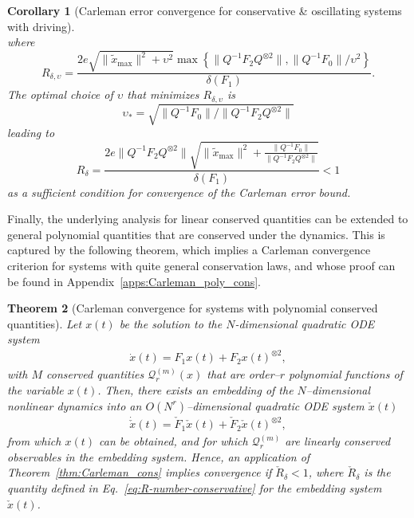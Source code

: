 \documentclass[superscriptaddress,onecolumn,nofootinbib,longbibliography,a4paper,accepted=2026-09-29]{quantumarticle}
\theoremstyle{plain}
\newtheorem{thm}{Theorem}
\newtheorem{cor}[thm]{Corollary}
\theoremstyle{definition}
\numberwithin{thm}{section}
\numberwithin{assumption}{section}
\numberwithin{lemma}{section}
\numberwithin{prop}{section}
\numberwithin{cor}{section}
\numberwithin{definition}{section}
\numberwithin{rmk}{section}
\numberwithin{equation}{section}
\newcommand{\ot}{\otimes}
\newcommand\Q{ {\mathcal Q} }
\begin{document}
\begin{cor}[Carleman error convergence for conservative \& oscillating systems with driving]
\begin{equation}
    \end{equation}
    where
    \begin{equation}
        R_{\delta,\upsilon}=\frac{2e\sqrt{\|\tilde{x}_{\mathrm{max}}\|^2+\upsilon^2} \max\left\{ \|Q^{-1}{F}_2 Q^{\ot 2}\|,\|Q^{-1}{F}_0\|/\upsilon^2\right\}}{\delta(F_1)}.
    \end{equation}
    The optimal choice of $\upsilon$ that minimizes $R_{\delta,\upsilon}$ is
    \begin{equation}
    \upsilon_*=\sqrt{\|Q^{-1}F_0\|/\|Q^{-1}F_2 Q^{\ot 2}\|}
    \end{equation}
    leading to
    \begin{equation}
        R_{\delta}=  \frac{2e\|Q^{-1}F_2Q^{\otimes 2}\| \sqrt{\|\tilde{x}_{\mathrm{max}}\|^2+\frac{\|Q^{-1} F_0\|}{\|Q^{-1}F_2Q^{\otimes 2}\|}}}{\delta(F_1)}<1
    \end{equation}
    as a sufficient condition for convergence of the Carleman error bound.
\end{cor}

Finally, the underlying analysis for linear conserved quantities can be extended to general polynomial quantities that are conserved under the dynamics. This is captured by the following theorem, which implies a Carleman convergence criterion for systems with quite general conservation laws, and whose proof can be found in Appendix~\ref{apps:Carleman_poly_cons}.
\begin{thm}[Carleman convergence for systems with polynomial conserved quantities]
    \label{thm:Carleman_poly_cons}
        Let $x(t)$ be the solution to the $N$-dimensional quadratic ODE system
    \begin{align}
    \dot{x}(t) = F_1 x(t)+ F_2x(t)^{\otimes 2}, 
    \end{align}
    with $M$ conserved quantities $\Q_r^{(m)}(x)$ that are order--$r$ polynomial functions of the variable $x(t)$. Then, there exists an embedding of the $N$--dimensional nonlinear dynamics into an $O(N^r)$--dimensional quadratic ODE system $\check{x}(t)$ 
    \begin{align}
    \dot{\check{x}}(t) = \check{F}_1 \check{x}(t)+ \check{F}_2\check{x}(t)^{\otimes 2},
    \end{align}
    from which $x(t)$ can be obtained, and for which $\Q_r^{(m)}$ are linearly conserved observables in the embedding system. Hence, an application of Theorem~\ref{thm:Carleman_cons} implies convergence if $\check{R}_\delta<1$, where $\check{R}_\delta$ is the quantity defined in Eq.~\eqref{eq:R-number-conservative} for the embedding system $\check{x}(t)$.
\end{thm}
\end{document}
